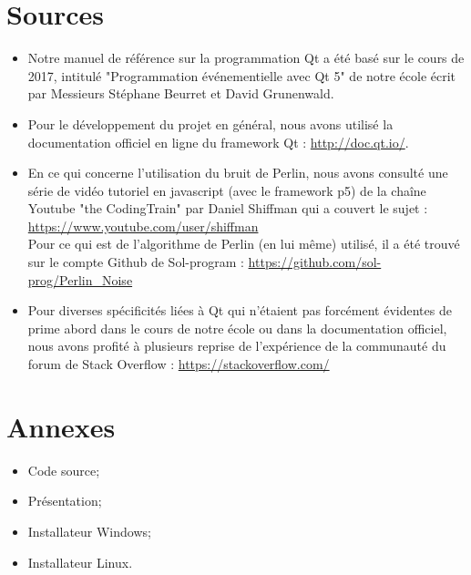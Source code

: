 \documentclass[a4paper,10pt,openany,oneside]{report}
\begin{document}
\chapter{Sources}
\begin{itemize}
\item Notre manuel de référence sur la programmation Qt a été basé sur le cours de 2017, intitulé "Programmation événementielle avec Qt 5" de notre école écrit par Messieurs Stéphane Beurret et David Grunenwald.
\item Pour le développement du projet en général, nous avons utilisé la documentation officiel en ligne du framework Qt : \url{http://doc.qt.io/}.
\item En ce qui concerne l'utilisation du bruit de Perlin, nous avons consulté une série de vidéo tutoriel en javascript (avec le framework p5) de la chaîne Youtube "the CodingTrain" par Daniel Shiffman qui a couvert le sujet : \url{https://www.youtube.com/user/shiffman}\\
Pour ce qui est de l'algorithme de Perlin (en lui même) utilisé, il a été trouvé sur le compte Github de Sol-program :
\url{https://github.com/sol-prog/Perlin_Noise}
\item Pour diverses spécificités liées à Qt qui n'étaient pas forcément évidentes de prime abord dans le cours de notre école ou dans la documentation officiel, nous avons profité à plusieurs reprise de l'expérience de la communauté du forum de Stack Overflow : \url{https://stackoverflow.com/}
\end{itemize}

\chapter{Annexes}
\thispagestyle{headings}
\begin{itemize}
\item Code source;
\item Présentation;
\item Installateur Windows;
\item Installateur Linux.
\end{itemize}
\end{document}

